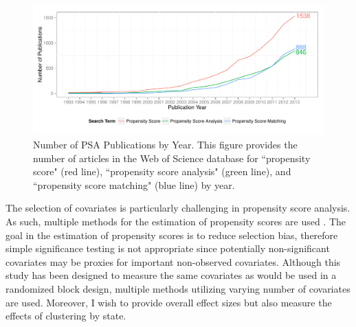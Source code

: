 \documentclass[letterpaper,12pt]{article} %
\begin{document}
\setlength{\belowcaptionskip}{-10pt}
\begin{figure}[t]
\begin{center}
\includegraphics[width=.9\textwidth]{../Figures/PSACitations}
\caption[Number of PSA Publications by Year]{Number of PSA Publications by Year. This figure provides the number of articles in the Web of Science database for ``propensity score" (red line), ``propensity score analysis" (green line), and ``propensity score matching" (blue line) by year.}
\label{fig:PSApublications}
\end{center}
\end{figure}
\setlength{\belowcaptionskip}{0pt}

The selection of covariates is particularly challenging in propensity score analysis. As such, multiple methods for the estimation of propensity scores are used \cite{Rosenbaum2012}. The goal in the estimation of propensity scores is to reduce selection bias, therefore simple significance testing is not appropriate \cite{Rosenbaum2002,Rosenbaum2010} since potentially non-significant covariates may be proxies for important non-observed covariates. Although this study has been designed to measure the same covariates as would be used in a randomized block design, multiple methods utilizing varying number of covariates are used. Moreover, I wish to provide overall effect sizes but also measure the effects of clustering by state. 
\end{document}
